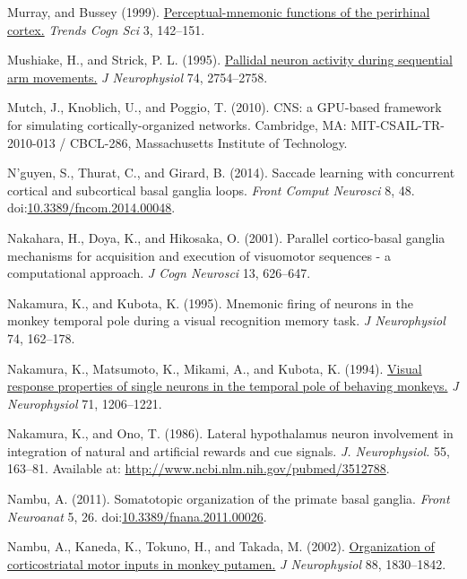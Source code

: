\documentclass[
  11pt,
  a4paper,
]{scrbook}
\newlength{\cslhangindent}
\newenvironment{CSLReferences}[2] %
 {\begin{list}{}{%
  \setlength{\itemindent}{0pt}
  \setlength{\leftmargin}{0pt}
  \setlength{\parsep}{0pt}
  \ifodd #1
   \setlength{\leftmargin}{\cslhangindent}
   \setlength{\itemindent}{-1\cslhangindent}
  \fi
  \setlength{\itemsep}{#2\baselineskip}}}
 {\end{list}}
\begin{document}
\begin{CSLReferences}{1}{1}
Murray, and Bussey (1999).
\href{https://www.ncbi.nlm.nih.gov/pubmed/10322468}{Perceptual-mnemonic
functions of the perirhinal cortex.} \emph{Trends Cogn Sci} 3, 142--151.

Mushiake, H., and Strick, P. L. (1995).
\href{https://www.ncbi.nlm.nih.gov/pubmed/8747231}{Pallidal neuron
activity during sequential arm movements.} \emph{J Neurophysiol} 74,
2754--2758.

Mutch, J., Knoblich, U., and Poggio, T. (2010). {CNS: a GPU-based
framework for simulating cortically-organized networks}. Cambridge, MA:
MIT-CSAIL-TR-2010-013 / CBCL-286, Massachusetts Institute of Technology.

N'guyen, S., Thurat, C., and Girard, B. (2014). Saccade learning with
concurrent cortical and subcortical basal ganglia loops. \emph{Front
Comput Neurosci} 8, 48.
doi:\href{https://doi.org/10.3389/fncom.2014.00048}{10.3389/fncom.2014.00048}.

Nakahara, H., Doya, K., and Hikosaka, O. (2001). Parallel cortico-basal
ganglia mechanisms for acquisition and execution of visuomotor sequences
- a computational approach. \emph{J Cogn Neurosci} 13, 626--647.

Nakamura, K., and Kubota, K. (1995). Mnemonic firing of neurons in the
monkey temporal pole during a visual recognition memory task. \emph{J
Neurophysiol} 74, 162--178.

Nakamura, K., Matsumoto, K., Mikami, A., and Kubota, K. (1994).
\href{https://www.ncbi.nlm.nih.gov/pubmed/8201413}{Visual response
properties of single neurons in the temporal pole of behaving monkeys.}
\emph{J Neurophysiol} 71, 1206--1221.

Nakamura, K., and Ono, T. (1986). {Lateral hypothalamus neuron
involvement in integration of natural and artificial rewards and cue
signals.} \emph{J. Neurophysiol.} 55, 163--81. Available at:
\url{http://www.ncbi.nlm.nih.gov/pubmed/3512788}.

Nambu, A. (2011). Somatotopic organization of the primate basal ganglia.
\emph{Front Neuroanat} 5, 26.
doi:\href{https://doi.org/10.3389/fnana.2011.00026}{10.3389/fnana.2011.00026}.

Nambu, A., Kaneda, K., Tokuno, H., and Takada, M. (2002).
\href{https://www.ncbi.nlm.nih.gov/pubmed/12364509}{Organization of
corticostriatal motor inputs in monkey putamen.} \emph{J Neurophysiol}
88, 1830--1842.


\end{CSLReferences}
\end{document}

